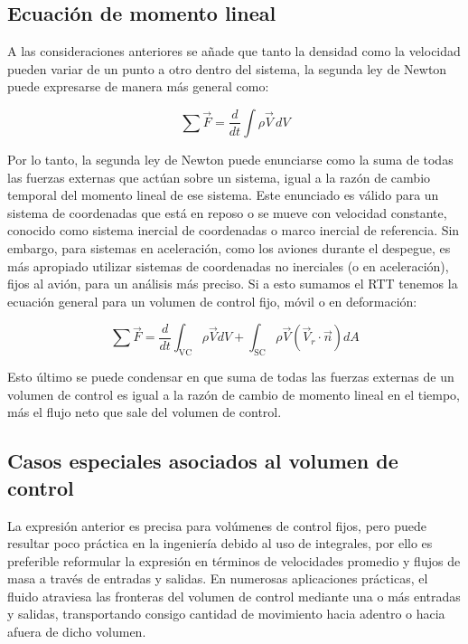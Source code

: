 \documentclass[10pt, oneside]{article}
\begin{document}
\subsection{Ecuación de momento lineal}
A las consideraciones anteriores se añade que tanto la densidad como la velocidad pueden variar de un punto a otro dentro del sistema, la segunda ley de Newton puede expresarse de manera más general como:

\begin{equation}
\sum \vec{F} = \frac{d}{dt} \int \rho \vec{V} \, dV
\end{equation}

Por lo tanto, la segunda ley de Newton puede enunciarse como la suma de todas las fuerzas externas que actúan sobre un sistema, igual a la razón de cambio temporal del momento lineal de ese sistema. Este enunciado es válido para un sistema de coordenadas que está en reposo o se mueve con velocidad constante, conocido como sistema inercial de coordenadas o marco inercial de referencia. Sin embargo, para sistemas en aceleración, como los aviones durante el despegue, es más apropiado utilizar sistemas de coordenadas no inerciales (o en aceleración), fijos al avión, para un análisis más preciso. Si a esto sumamos el RTT tenemos la ecuación general para un volumen de control fijo, móvil o en deformación: 

\begin{equation}
\sum \vec{F}=\frac{d}{d t} \int_{\mathrm{VC}} \rho \vec{V} d V+\int_{\mathrm{SC}} \rho \vec{V}\left(\vec{V}_r \cdot \vec{n}\right) d A
\end{equation}

Esto último se puede condensar en que suma de todas las fuerzas externas de un volumen de control es igual a la razón de cambio de momento lineal en el tiempo, más el flujo neto que sale del volumen de control. 

\subsection{Casos especiales asociados al volumen de control}

La expresión anterior es precisa para volúmenes de control fijos, pero puede resultar poco práctica en la ingeniería debido al uso de integrales, por ello es preferible reformular la expresión en términos de velocidades promedio y flujos de masa a través de entradas y salidas. En numerosas aplicaciones prácticas, el fluido atraviesa las fronteras del volumen de control mediante una o más entradas y salidas, transportando consigo cantidad de movimiento hacia adentro o hacia afuera de dicho volumen.
\end{document}
